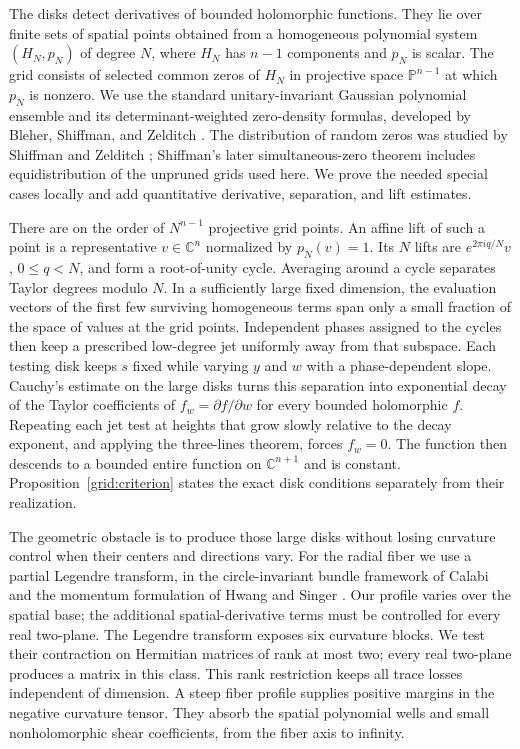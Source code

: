 The disks detect derivatives of bounded holomorphic functions. They
lie over finite sets of spatial points obtained from a homogeneous
polynomial system $(H_N,p_N)$ of degree $N$, where $H_N$ has $n-1$
components and $p_N$ is scalar. The grid consists of selected common
zeros of $H_N$ in projective space $\mathbb P^{n-1}$ at which $p_N$
is nonzero. We use the standard unitary-invariant
Gaussian polynomial ensemble and its determinant-weighted zero-density
formulas, developed by Bleher, Shiffman, and Zelditch
\citep[Theorem~2.1 and Sections~2.2 and~2.4]{BleherShiffmanZelditch2000}.
The distribution of random zeros was studied by Shiffman and Zelditch
\citep{ShiffmanZelditch1999}; Shiffman's later simultaneous-zero theorem
\citep[Corollary~1.3]{Shiffman2008Convergence} includes equidistribution
of the unpruned grids used here. We prove the needed special cases
locally and add quantitative derivative, separation, and lift estimates.

There are on the order of $N^{n-1}$ projective grid points. An affine
lift of such a point is a representative $v\in\mathbb C^n$ normalized
by $p_N(v)=1$. Its $N$ lifts are $e^{2\pi iq/N}v$, $0\le q<N$, and
form a root-of-unity cycle. Averaging around a cycle separates Taylor degrees modulo $N$. In a sufficiently large
fixed dimension, the evaluation vectors of the first few surviving
homogeneous terms span only a small fraction of the space of values
at the grid points. Independent phases assigned to the cycles then
keep a prescribed low-degree jet uniformly away from that subspace.
Each testing disk keeps $s$ fixed while varying $y$ and $w$ with a
phase-dependent slope. Cauchy's estimate on the large disks turns this separation into
exponential decay of the Taylor coefficients of $f_w=\partial f/\partial w$
for every bounded holomorphic $f$. Repeating each jet test at heights that grow slowly
relative to the decay exponent, and applying the three-lines theorem,
forces $f_w=0$. The function then descends to a bounded entire function
on $\mathbb C^{n+1}$ and is constant. Proposition~\ref{grid:criterion}
states the exact disk conditions separately from their realization.

The geometric obstacle is to produce those large disks without losing
curvature control when their centers and directions vary. For the
radial fiber we use a partial Legendre transform, in the circle-invariant
bundle framework of Calabi \citep[Section~3]{Calabi1979} and the momentum
formulation of Hwang and Singer \citep[Section~2.1]{HwangSinger2002}.
Our profile varies over the spatial base; the additional spatial-derivative
terms must be controlled for every real two-plane. The Legendre transform
exposes six curvature blocks. We test their contraction on Hermitian
matrices of rank at most two; every real two-plane produces a matrix
in this class. This rank restriction keeps all trace losses independent of dimension.
A steep fiber profile supplies positive margins in the negative
curvature tensor. They absorb the spatial polynomial wells and small
nonholomorphic shear coefficients, from the fiber axis to infinity.

